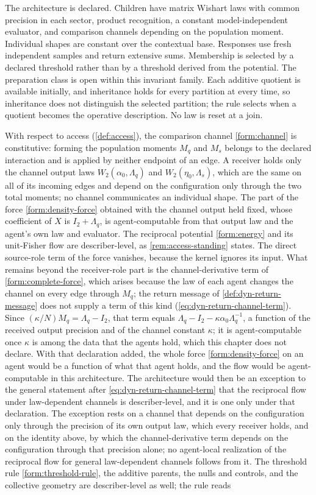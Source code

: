 The architecture is declared. Children have matrix Wishart laws with common precision in each sector, product recognition, a constant model-independent evaluator, and comparison channels depending on the population moment. Individual shapes are constant over the contextual base. Responses use fresh independent samples and return extensive sums. Membership is selected by a declared threshold rather than by a threshold derived from the potential. The preparation class is open within this invariant family. Each additive quotient is available initially, and inheritance holds for every partition at every time, so inheritance does not distinguish the selected partition; the rule selects when a quotient becomes the operative description. No law is reset at a join.

With respect to access (\cref{def:access}), the comparison channel \cref{form:channel} is constitutive: forming the population moments $M_q$ and $M_s$ belongs to the declared interaction and is applied by neither endpoint of an edge. A receiver holds only the channel output laws $W_2(\alpha_0,\Lambda_q)$ and $W_2(\eta_0,\Lambda_s)$, which are the same on all of its incoming edges and depend on the configuration only through the two total moments; no channel communicates an individual shape. The part of the force \cref{form:density-force} obtained with the channel output held fixed, whose coefficient of $X$ is $I_2+\Lambda_q$, is agent-computable from that output law and the agent's own law and evaluator. The reciprocal potential \cref{form:energy} and its unit-Fisher flow are describer-level, as \cref{rem:access-standing} states. The direct source-role term of the force vanishes, because the kernel ignores its input. What remains beyond the receiver-role part is the channel-derivative term of \cref{form:complete-force}, which arises because the law of each agent changes the channel on every edge through $M_q$; the return message of \cref{def:dyn-return-message} does not supply a term of this kind (\cref{eq:dyn-return-channel-term}). Since $(\kappa/N)M_q=\Lambda_q-I_2$, that term equals $\Lambda_q-I_2-\kappa\alpha_0\Lambda_q^{-1}$, a function of the received output precision and of the channel constant $\kappa$; it is agent-computable once $\kappa$ is among the data that the agents hold, which this chapter does not declare. With that declaration added, the whole force \cref{form:density-force} on an agent would be a function of what that agent holds, and the flow would be agent-computable in this architecture. The architecture would then be an exception to the general statement after \cref{eq:dyn-return-channel-term} that the reciprocal flow under law-dependent channels is describer-level, and it is one only under that declaration. The exception rests on a channel that depends on the configuration only through the precision of its own output law, which every receiver holds, and on the identity above, by which the channel-derivative term depends on the configuration through that precision alone; no agent-local realization of the reciprocal flow for general law-dependent channels follows from it. The threshold rule \cref{form:threshold-rule}, the additive parents, the nulls and controls, and the collective geometry are describer-level as well; the rule reads 